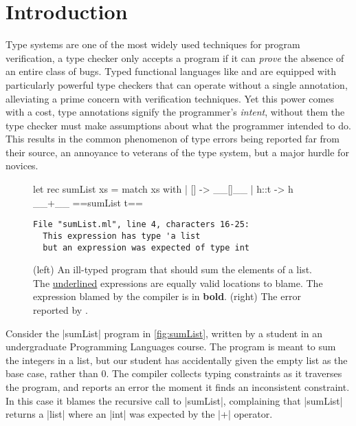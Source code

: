 \section{Introduction}
\label{sec:introduction}

Type systems are one of the most widely used techniques for program
verification, a type checker only accepts a program if it can
\emph{prove} the absence of an entire class of bugs.
%
Typed functional languages like \ocaml and \haskell are equipped with
particularly powerful type checkers that can operate without a single
annotation, alleviating a prime concern with verification techniques.
%
Yet this power comes with a cost, type annotations signify the
programmer's \emph{intent}, without them the type checker must
make assumptions about what the programmer intended to do.
%
This results in the common phenomenon of type errors being reported far
from their source, an annoyance to veterans of the type system, but a
major hurdle for novices.

\begin{figure}[ht]
\begin{minipage}{0.45\linewidth}
\begin{ecode}
  let rec sumList xs =
    match xs with
    | []   -> __[]__
    | h::t -> h __+__ ==sumList t==
\end{ecode}
\end{minipage}
\begin{minipage}{0.49\linewidth}
\begin{verbatim}
File "sumList.ml", line 4, characters 16-25:
  This expression has type 'a list
  but an expression was expected of type int
\end{verbatim}
\end{minipage}
\caption{(left) An ill-typed \ocaml program that should sum the elements of a
  list. The \underline{underlined} expressions are equally valid
  locations to blame. The expression blamed by the \ocaml compiler
  is in \textbf{bold}.
  (right) The error reported by \ocaml.}
\label{fig:sumList}
\end{figure}
%
Consider the |sumList| program in \autoref{fig:sumList}, written by a
student in an undergraduate Programming Languages course.
%
The program is meant to sum the integers in a list, but our student has
accidentally given the empty list as the base case, rather than 0.
%
The \ocaml compiler collects typing constraints as it traverses the
program, and reports an error the moment it finds an inconsistent
constraint.
%
In this case it blames the recursive call to |sumList|, complaining that
|sumList| returns a |list| where an |int| was expected by the |+|
operator.

